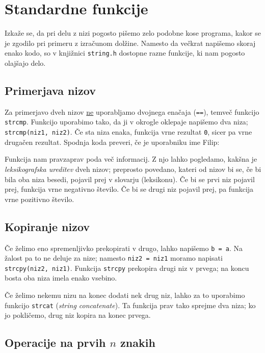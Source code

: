 \documentclass{book}
\begin{document}
\section{Standardne funkcije}

Izkaže se, da pri delu z nizi pogosto pišemo zelo podobne kose programa, kakor
se je zgodilo pri primeru z izračunom dolžine.
Namesto da večkrat napišemo skoraj enako kodo, so v knjižnici \verb+string.h+
dostopne razne funkcije, ki nam pogosto olajšajo delo.

\subsection{Primerjava nizov}

Za primerjavo dveh nizov \underline{ne} uporabljamo dvojnega enačaja
(\verb+==+), temveč funkcijo \verb+strcmp+.
Funkcijo uporabimo tako, da ji v okrogle oklepaje napišemo dva niza;
\verb+strcmp(niz1, niz2)+.
Če sta niza enaka, funkcija vrne rezultat \verb+0+, sicer pa vrne drugačen
rezultat.
Spodnja koda preveri, če je uporabniku ime Filip:

Funkcija nam pravzaprav poda več informacij.
Z njo lahko pogledamo, kakšna je \textit{leksikografska ureditev} dveh nizov;
preprosto povedano, kateri od nizov bi se, če bi bila oba niza besedi, pojavil
prej v slovarju (leksikonu).
Če bi se prvi niz pojavil prej, funkcija vrne negativno število.
Če bi se drugi niz pojavil prej, pa funkcija vrne pozitivno število.

\subsection{Kopiranje nizov}

Če želimo eno spremenljivko prekopirati v drugo, lahko napišemo \verb+b = a+.
Na žalost pa to ne deluje za nize; namesto \verb+niz2 = niz1+ moramo napisati
\verb+strcpy(niz2, niz1)+.
Funkcija \verb+strcpy+ prekopira drugi niz v prvega; na koncu bosta oba niza
imela enako vsebino.

Če želimo nekemu nizu na konec dodati nek drug niz, lahko za to uporabimo
funkcijo \verb+strcat+ (\textit{string concatenate}).
Ta funkcija prav tako sprejme dva niza; ko jo pokličemo, drug niz kopira na
konec prvega.

\subsection{Operacije na prvih $n$ znakih}
\end{document}
